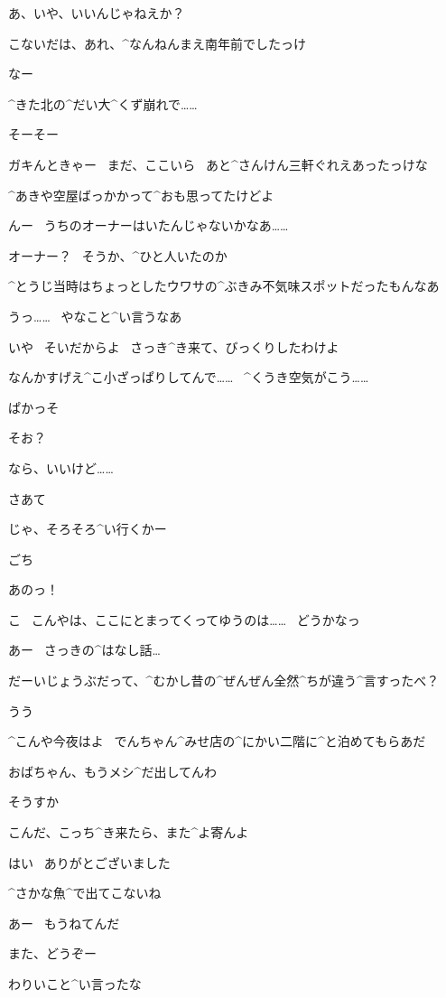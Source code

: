 \Y あ、いや、いいんじゃねえか？

\page
\A こないだは、あれ、^{なんねんまえ}{南年前}でしたっけ

\Y なー

\Y ^{きた}{北}の^{だい}{大}^{くず}{崩}れで……

\A そーそー

\page
\Y ガキんときゃー
\ まだ、ここいら
\ あと^{さんけん}{三軒}ぐれえあったっけな

\Y ^{あきや}{空屋}ばっかかって^{おも}{思}ってたけどよ

\A んー
\ うちのオーナーはいたんじゃないかなあ……

\Y オーナー？
\ そうか、^{ひと}{人}いたのか

\page
\Y ^{とうじ}{当時}はちょっとしたウワサの^{ぶきみ}{不気味}スポットだったもんなあ

\A うっ……
\ やなこと^{い}{言}うなあ

\Y いや
\ そいだからよ
\ さっき^{き}{来}て、びっくりしたわけよ

\Y なんかすげえ^{こ}{小}ざっぱりしてんで……
\ ^{くうき}{空気}がこう……

\Y ぱかっそ

\A そお？

\A なら、いいけど……

\page
\Y さあて

\Y じゃ、そろそろ^{い}{行}くかー

\Y ごち

\A あのっ！

\A こ
\ こんやは、ここにとまってくってゆうのは……
\ どうかなっ

\Y あー
\ さっきの^{はなし}{話}…

\page
\Y だーいじょうぶだって、^{むかし}{昔}の^{ぜんぜん}{全然}^{ちが}{違}う^{言}{す}ったべ？

\A うう

\Y ^{こんや}{今夜}はよ
\ でんちゃん^{みせ}{店}の^{にかい}{二階}に^{と}{泊}めてもらあだ

\Y おばちゃん、もうメシ^{だ}{出}してんわ

\A そうすか

\Y こんだ、こっち^{き}{来}たら、また^{よ}{寄}んよ

\A はい
\ ありがとございました

\page
\A ^{さかな}{魚}^{で}{出}てこないね

\Y あー
\ もうねてんだ

\A また、どうぞー

\page
\Y わりいこと^{い}{言}ったな


